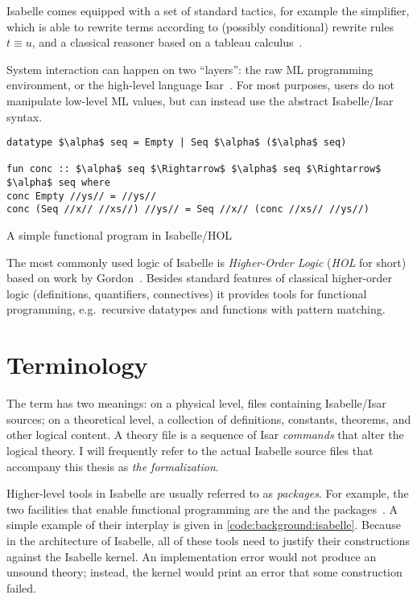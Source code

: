 \noindent
Isabelle comes equipped with a set of standard tactics, for example the simplifier, which is able to rewrite terms according to (possibly conditional) rewrite rules $t \equiv u$, and a classical reasoner based on a tableau calculus~\cite{paulson1999generic}.

System interaction can happen on two ``layers'': the raw ML programming environment, or the high-level language Isar~\cite{wenzel2002isar}.
For most purposes, users do not manipulate low-level ML values, but can instead use the abstract Isabelle/Isar syntax.

\begin{code}[t]
  \begin{lstlisting}
datatype $\alpha$ seq = Empty | Seq $\alpha$ ($\alpha$ seq)

fun conc :: $\alpha$ seq $\Rightarrow$ $\alpha$ seq $\Rightarrow$ $\alpha$ seq where
conc Empty //ys// = //ys//
conc (Seq //x// //xs//) //ys// = Seq //x// (conc //xs// //ys//)\end{lstlisting}
  \caption{A simple functional program in Isabelle/HOL}
  \label{code:background:isabelle}
\end{code}

The most commonly used logic of Isabelle is \emph{Higher-Order Logic} (\emph{HOL} for short) based on work by Gordon~\cite{gordon1993hol}.
Besides standard features of classical higher-order logic (definitions, quantifiers, connectives) it provides tools for functional programming, e.g.\ recursive datatypes and functions with pattern matching.

\section{Terminology}
\label{sec:background:terminology}

The term  has two meanings:
on a physical level, files containing Isabelle/Isar sources; on a theoretical level, a collection of definitions, constants, theorems, and other logical content.
A theory file is a sequence of Isar \emph{commands} that alter the logical theory.
I will frequently refer to the actual Isabelle source files that accompany this thesis as \emph{the formalization}.

Higher-level tools in Isabelle are usually referred to as \emph{packages}.
For example, the two facilities that enable functional programming are the  and the  packages~\cite{krauss2010recursive,krauss2009fun,blanchette2014datatypes}.
A simple example of their interplay is given in \cref{code:background:isabelle}.
Because in the architecture of Isabelle, all of these tools need to justify their constructions against the Isabelle kernel.
An implementation error would not produce an unsound theory; instead, the kernel would print an error that some construction failed.

